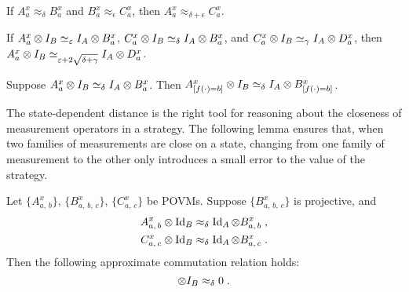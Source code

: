 \begin{fact}
  \label{fact:triangle}
  If $A_a^x \approx_\delta B_a^x$ and $B_a^x \approx_\epsilon C_a^x$, then
  $A_a^x \approx_{\delta + \epsilon} C_a^x$.
\end{fact}

\begin{fact}
 \label{fact:triangle-for-simeq}
 If $A_a^x \otimes I_B \simeq_\varepsilon I_A \otimes B_a^x$,
 $C_a^x \otimes I_B \simeq_\delta I_A \otimes  B_a^x$,
 and $C_a^x \otimes I_B \simeq_\gamma I_A \otimes  D_a^x$,
 then $A_a^x \otimes I_B \simeq_{\varepsilon + 2\sqrt{\delta + \gamma}} I_A \otimes  D_a^x$.
\end{fact}

\begin{fact}
  \label{fact:data-processing}
  Suppose $A^x_a \otimes I_B \simeq_{\delta} I_A \otimes B^x_a$.
  Then $A^x_{[f(\cdot) = b]} \otimes I_B \simeq_{\delta} I_A \otimes B^x_{[f(\cdot) = b]}$.
\end{fact}


The state-dependent distance is the right tool for reasoning about the closeness
of measurement operators in a strategy.
The following lemma ensures that, when two families of measurements are close on a
state, changing from one family of measurement to the other only introduces
a small error to the value of the strategy.

\begin{lemma}
  \label{lem:commutation-analysis}
  Let $\{A^x_{a,\, b}\}$, $\{B^x_{a,\, b,\, c}\}$, $\{C^x_{a,\, c}\}$ be POVMs.
  Suppose $\{B^x_{a,\, b,\, c}\}$ is projective, and
  \begin{align*}
    A^x_{a,\, b} \otimes \mathop{\rm Id}\nolimits_B &\approx_\delta \mathop{\rm Id}\nolimits_A \otimes B^x_{a,\, b}\;,\\
    C^x_{a,\, c} \otimes \mathop{\rm Id}\nolimits_B &\approx_\delta \mathop{\rm Id}\nolimits_A \otimes B^x_{a,\, c}\;.
  \end{align*}
  Then the following approximate commutation relation holds:
  \begin{equation*}
    [A^x_{a,\, b}, C^x_{a,\, c}] \otimes I_\bob \approx_\delta 0\;.
  \end{equation*}
\end{lemma}

